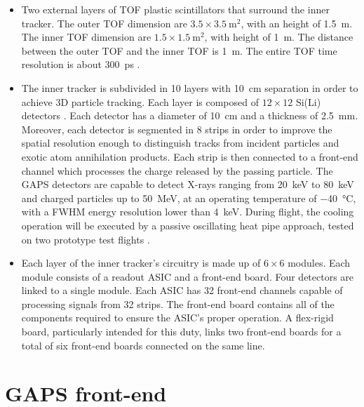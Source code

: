 \begin{itemize}
    \itemsep0em
    \item Two external layers of TOF plastic scintillators that surround the inner tracker. The outer TOF dimension are $3.5 \times \SI{3.5}{\metre\squared}$, with an height of \SI{1.5}{\metre}. The inner TOF dimension are $1.5 \times \SI{1.5}{\metre\squared}$, with height of \SI{1}{\metre}. The distance between the outer TOF and the inner TOF is \SI{1}{\metre}. The entire TOF time resolution is about \SI{300}{\pico\second} \cite{doetinchem_2020_cosmicray}.
    \item The inner tracker is subdivided in 10 layers with \SI{10}{\cm} separation in order to achieve 3D particle tracking. Each layer is composed of $12 \times 12$ Si(Li) detectors \cite{spieler_2014_semiconductor}. Each detector has a diameter of \SI{10}{\cm} and a thickness of \SI{2.5}{\mm}. Moreover, each detector is segmented in 8 strips in order to improve the spatial resolution enough to distinguish tracks from incident particles and exotic atom annihilation products. Each strip is then connected to a front-end channel which processes the charge released by the passing particle. The GAPS detectors are capable to detect X-rays ranging from \SI{20}{\kilo\electronvolt} to \SI{80}{\kilo\electronvolt} and charged particles up to \SI{50}{\mega\electronvolt}, at an operating temperature of \SI{-40}{\celsius}, with a FWHM energy resolution lower than \SI{4}{\kilo\electronvolt}. During flight, the cooling operation will be executed by a passive oscillating heat pipe approach, tested on two prototype test flights \cite{okazaki_2014_development}.
    \item Each layer of the inner tracker's circuitry is made up of $6 \times 6$ modules. Each module consists of a readout ASIC and a front-end board. Four detectors are linked to a single module. Each ASIC has 32 front-end channels capable of processing signals from 32 strips. The front-end board contains all of the components required to ensure the ASIC's proper operation. A flex-rigid board, particularly intended for this duty, links two front-end boards for a total of six front-end boards connected on the same line.
\end{itemize}


\section{GAPS front-end}
\label{secGAPSfrontend}


